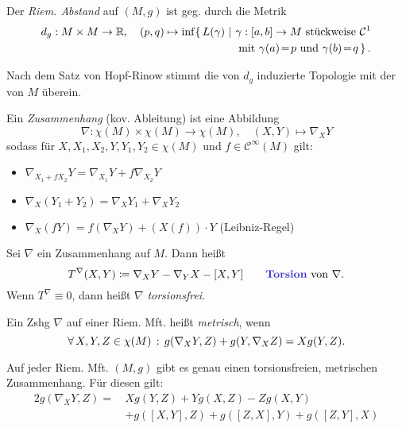 \documentclass{cheat-sheet}
\newcommand{\abinterval}{\cinterval{a}{b}} %
\newcommand{\Cont}{\mathcal{C}} %
\begin{document}
\begin{defn}
  Der \emph{Riem. Abstand} auf $(M, g)$ ist geg. durch die Metrik
  \begin{align*}
    d_g : M \times M \to \R, \quad
    (p, q) \mapsto \inf \{\, L(\gamma) \,\,|\,\, & \gamma : \abinterval \to M \text{ stückweise } \Cont^{1}\\
    & \left. \text{mit $\gamma(a) \!=\! p$ und $\gamma(b) \!=\! q$} \, \right\}.
  \end{align*}
\end{defn}

\begin{bem}
  Nach dem Satz von Hopf-Rinow stimmt die von $d_g$ induzierte Topologie mit der von $M$ überein.
\end{bem}


\begin{defn}
  Ein \emph{Zusammenhang} (kov. Ableitung) ist eine Abbildung
  \[
    \nabla : \chi(M) \times \chi(M) \to \chi(M), \quad
    (X, Y) \mapsto \nabla_X Y
  \]
  sodass für $X, X_1, X_2, Y, Y_1, Y_2 \in \chi(M)$ und $f \in \Cont^\infty(M)$ gilt:
  \begin{itemize}
    \item $\nabla_{X_1 + f X_2} Y = \nabla_{X_1} Y + f \nabla_{X_2} Y$
    \item $\nabla_X (Y_1 + Y_2) = \nabla_X Y_1 + \nabla_X Y_2$
    \item $\nabla_X (f Y) = f \left( \nabla_X Y \right) + (X(f)) \cdot Y$ \enspace (Leibniz-Regel)
  \end{itemize}
\end{defn}

\begin{defn}
  Sei $\nabla$ ein Zusammenhang auf $M$. Dann heißt
  \[
    T^\nabla(X, Y) \coloneqq \nabla_X Y - \nabla_Y X - [X, Y]
    \qquad \text{\emph{Torsion} von $\nabla$.}
  \]
  Wenn $T^\nabla \equiv 0$, dann heißt $\nabla$ \emph{torsionsfrei}.
\end{defn}

\begin{defn}
  Ein Zshg $\nabla$ auf einer Riem. Mft. heißt \emph{metrisch}, wenn
  \[ \forall \, {X, Y, Z \in \chi(M)} \,:\, g(\nabla_X Y, Z) + g(Y, \nabla_X Z) = X g(Y, Z). \]
\end{defn}

\begin{thm}
  Auf jeder Riem. Mft. $(M, g)$ gibt es genau einen torsionsfreien, metrischen Zusammenhang. Für diesen gilt:
  \begin{align*}
    2 g(\nabla_X Y, Z) = \, & X g(Y, Z) + Y g(X, Z) - Z g(X, Y)\\
    & + g([X, Y], Z) + g([Z, X], Y) + g([Z, Y], X)
  \end{align*}
\end{thm}
\end{document}
